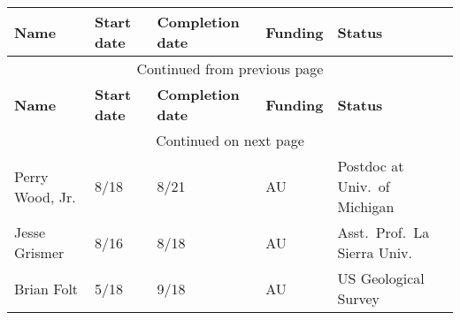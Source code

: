 {\sffamily\small
{}
\begin{longtable}[l]{ p{1.2in} p{0.5in} p{0.7in} p{0.7in} p{2.5in} }
    \hline
    \textbf{Name} & \textbf{Start date} & \textbf{Completion date} & \textbf{Funding} & \textbf{Status} \\
    \hline
    \endfirsthead
    \multicolumn{5}{c}{{Continued from previous page}} \\
    \hline
    \textbf{Name} & \textbf{Start date} & \textbf{Completion date} & \textbf{Funding} & \textbf{Status} \\
    \hline
    \endhead
    \hline \multicolumn{5}{c}{{Continued on next page}} \\
    \endfoot
    \hline
    \endlastfoot
    Perry Wood, Jr. & 8/18 & 8/21 & AU & Postdoc at Univ.\ of Michigan \\
    Jesse Grismer & 8/16 & 8/18 & AU & Asst.\ Prof.\, La Sierra Univ. \\
    Brian Folt & 5/18 & 9/18 & AU & US Geological Survey \\
\end{longtable}
}
